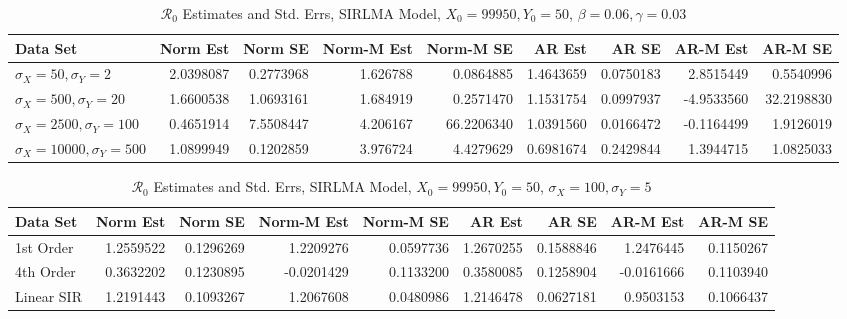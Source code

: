 \documentclass[12pt]{article}
\newcommand{\rr}{\ensuremath{\mathcal{R}_0}}
\begin{document}
\begin{table}[H]
	
	\caption{\label{tab:}$\rr$ Estimates and Std. Errs, SIRLMA Model,
		$X_0 = 99950, Y_0 = 50$, $\beta = 0.06, \gamma = 0.03$}
	\centering
	\begin{footnotesize}
		\begin{tabular}[t]{l|r|r|r|r|r|r|r|r}
			\hline
			Data Set & Norm Est & Norm SE & Norm-M Est & Norm-M SE & AR Est & AR SE & AR-M Est & AR-M SE\\
			\hline
			$\sigma_X = 50, \sigma_Y = 2$ & 2.0398087 & 0.2773968 & 1.626788 & 0.0864885 & 1.4643659 & 0.0750183 & 2.8515449 & 0.5540996\\
			\hline
			$\sigma_X = 500, \sigma_Y = 20$ & 1.6600538 & 1.0693161 & 1.684919 & 0.2571470 & 1.1531754 & 0.0997937 & -4.9533560 & 32.2198830\\
			\hline
			$\sigma_X = 2500, \sigma_Y = 100$ & 0.4651914 & 7.5508447 & 4.206167 & 66.2206340 & 1.0391560 & 0.0166472 & -0.1164499 & 1.9126019\\
			\hline
			$\sigma_X = 10000, \sigma_Y = 500$ & 1.0899949 & 0.1202859 & 3.976724 & 4.4279629 & 0.6981674 & 0.2429844 & 1.3944715 & 1.0825033\\
			\hline
		\end{tabular}
	\end{footnotesize}
\end{table}

\begin{table}[H]
	
	\caption{\label{tab:}$\rr$ Estimates and Std. Errs, SIRLMA Model,
		$X_0 = 99950, Y_0 = 50$, $\sigma_X = 100, \sigma_Y = 5$}
	\centering
	\begin{footnotesize}
		\begin{tabular}[t]{l|r|r|r|r|r|r|r|r}
			\hline
			Data Set & Norm Est & Norm SE & Norm-M Est & Norm-M SE & AR Est & AR SE & AR-M Est & AR-M SE\\
			\hline
			1st Order & 1.2559522 & 0.1296269 & 1.2209276 & 0.0597736 & 1.2670255 & 0.1588846 & 1.2476445 & 0.1150267\\
			\hline
			4th Order & 0.3632202 & 0.1230895 & -0.0201429 & 0.1133200 & 0.3580085 & 0.1258904 & -0.0161666 & 0.1103940\\
			\hline
			Linear SIR & 1.2191443 & 0.1093267 & 1.2067608 & 0.0480986 & 1.2146478 & 0.0627181 & 0.9503153 & 0.1066437\\
			\hline
		\end{tabular}
	\end{footnotesize}
\end{table}
\end{document}

